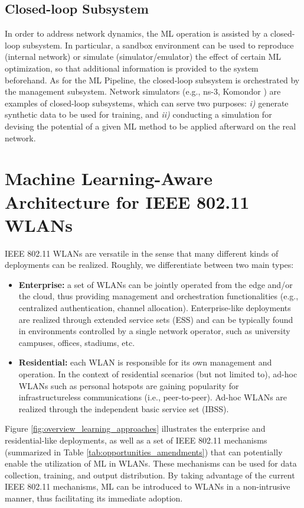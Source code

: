 \documentclass[twocolumn]{article}
\begin{document}
\subsection{Closed-loop Subsystem} 
In order to address network dynamics, the ML operation is assisted by a closed-loop subsystem. In particular, a sandbox environment can be used to reproduce (internal network) or simulate (simulator/emulator) the effect of certain ML optimization, so that additional information is provided to the system beforehand. As for the ML Pipeline, the closed-loop subsystem is orchestrated by the management subsystem. Network simulators (e.g., ns-3, Komondor \cite{barrachina2019komondor}) are examples of closed-loop subsystems, which can serve two purposes: \emph{i)} generate synthetic data to be used for training, and \emph{ii)} conducting a simulation for devising the potential of a given ML method to be applied afterward on the real network.

\section{Machine Learning-Aware Architecture for IEEE 802.11 WLANs}
\label{section:wlans_architecture}

IEEE 802.11 WLANs are versatile in the sense that many different kinds of deployments can be realized. Roughly, we differentiate between two main types:
\begin{itemize}
    \item \textbf{Enterprise:} a set of WLANs can be jointly operated from the edge and/or the cloud, thus providing management and orchestration functionalities (e.g., centralized authentication, channel allocation). Enterprise-like deployments are realized through extended service sets (ESS) and can be typically found in environments controlled by a single network operator, such as university campuses, offices, stadiums, etc. 
    \item \textbf{Residential:} each WLAN is responsible for its own management and operation. In the context of residential scenarios (but not limited to), ad-hoc WLANs such as personal hotspots are gaining popularity for infrastructureless communications (i.e., peer-to-peer). Ad-hoc WLANs are realized through the independent basic service set (IBSS).
\end{itemize}

Figure \ref{fig:overview_learning_approaches} illustrates the enterprise and residential-like deployments, as well as a set of IEEE 802.11 mechanisms (summarized in Table \ref{tab:opportunities_amendments}) that can potentially enable the utilization of ML in WLANs. These mechanisms can be used for data collection, training, and output distribution. By taking advantage of the current IEEE 802.11 mechanisms, ML can be introduced to WLANs in a non-intrusive manner, thus facilitating its immediate adoption. 
\end{document}
